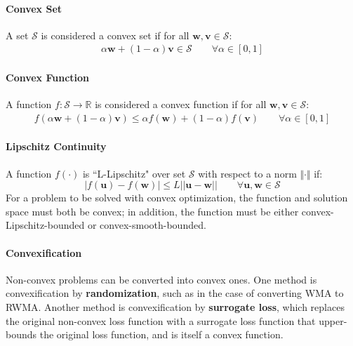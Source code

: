 \documentclass[11pt]{article}
\begin{document}
\paragraph{Convex Set} A set $\mathcal{S}$ is considered a convex set if for all $\boldsymbol{w}, \boldsymbol{v} \in \mathcal{S}$:
\begin{align}
    \alpha \boldsymbol{w} + (1 - \alpha) \boldsymbol{v} \in \mathcal{S} \quad \quad \forall \alpha \in [0,1]
\end{align}
\paragraph{Convex Function}
A function $f : \mathcal{S} \rightarrow \mathbb{R}$ is considered a convex function if for all $\boldsymbol{w}, \boldsymbol{v} \in \mathcal{S}$:
\begin{align}
    f(\alpha \boldsymbol{w} + (1 - \alpha) \boldsymbol{v}) \leq \alpha f(\boldsymbol{w}) + (1 - \alpha) f(\boldsymbol{v}) \quad \quad \forall \alpha \in [0,1]
    \label{eqn:convex_func}
\end{align}
\paragraph{Lipschitz Continuity}
A function $f(\cdot)$ is ``L-Lipschitz" over set $\mathcal{S}$ with respect to a norm $\Vert \cdot \Vert$ if:
\begin{equation}
    \label{eq:lipschitz}
    |f(\boldsymbol{u}) - f(\boldsymbol{w})| \leq L || \boldsymbol{u} - \boldsymbol{w} || \quad \quad \forall \boldsymbol{u}, \boldsymbol{w} \in \mathcal{S}
\end{equation}
For a problem to be solved with convex optimization, the function and solution space must both be convex; in addition, the function must be either convex-Lipschitz-bounded or convex-smooth-bounded.
\paragraph{Convexification}
Non-convex problems can be converted into convex ones. One method is convexification by \textbf{randomization}, such as in the case of converting WMA to RWMA. Another method is convexification by \textbf{surrogate loss}, which replaces the original non-convex loss function with a surrogate loss function that upper-bounds the original loss function, and is itself a convex function.
\end{document}
